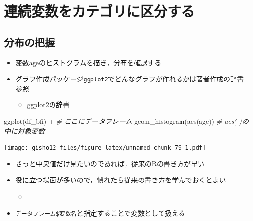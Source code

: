 \documentclass[
  xelatex,ja=standard, b5paper]{bxjsbook}
\newenvironment{Shaded}{\begin{snugshade}}{\end{snugshade}}
\newcommand{\CommentTok}[1]{\textcolor[rgb]{0.56,0.35,0.01}{\textit{#1}}}
\newcommand{\FunctionTok}[1]{\textcolor[rgb]{0.00,0.00,0.00}{#1}}
\newcommand{\NormalTok}[1]{#1}
\newcommand{\SpecialCharTok}[1]{\textcolor[rgb]{0.00,0.00,0.00}{#1}}
\providecommand{\tightlist}{%
  \setlength{\itemsep}{0pt}\setlength{\parskip}{0pt}}
\begin{document}
\hypertarget{ux9023ux7d9aux5909ux6570ux3092ux30abux30c6ux30b4ux30eaux306bux533aux5206ux3059ux308b}{%
\section{連続変数をカテゴリに区分する}\label{ux9023ux7d9aux5909ux6570ux3092ux30abux30c6ux30b4ux30eaux306bux533aux5206ux3059ux308b}}

\hypertarget{ux5206ux5e03ux306eux628aux63e1}{%
\subsection{分布の把握}\label{ux5206ux5e03ux306eux628aux63e1}}

\begin{itemize}
\tightlist
\item
  変数ageのヒストグラムを描き，分布を確認する
\item
  グラフ作成パッケージ\texttt{ggplot2}でどんなグラフが作れるかは著者作成の辞書参照

  \begin{itemize}
  \tightlist
  \item
    \href{https://izunyan.github.io/practice_ggplot2/}{ggplot2の辞書}
  \end{itemize}
\end{itemize}

\begin{Shaded}
\begin{Highlighting}[]
\FunctionTok{ggplot}\NormalTok{(df\_bfi) }\SpecialCharTok{+}           \CommentTok{\# ここにデータフレーム}
  \FunctionTok{geom\_histogram}\NormalTok{(}\FunctionTok{aes}\NormalTok{(age)) }\CommentTok{\# aes( )の中に対象変数}
\end{Highlighting}
\end{Shaded}

\texttt{[image: gisho12\_files/figure-latex/unnamed-chunk-79-1.pdf]}

\begin{itemize}
\tightlist
\item
  さっと中央値だけ見たいのであれば，従来のRの書き方が早い
\item
  役に立つ場面が多いので，慣れたら従来の書き方を学んでおくとよい

  \begin{itemize}
  \tightlist
  \item
  \end{itemize}
\item
  \texttt{データフレーム\$変数名}と指定することで変数として扱える
\end{itemize}
\end{document}
